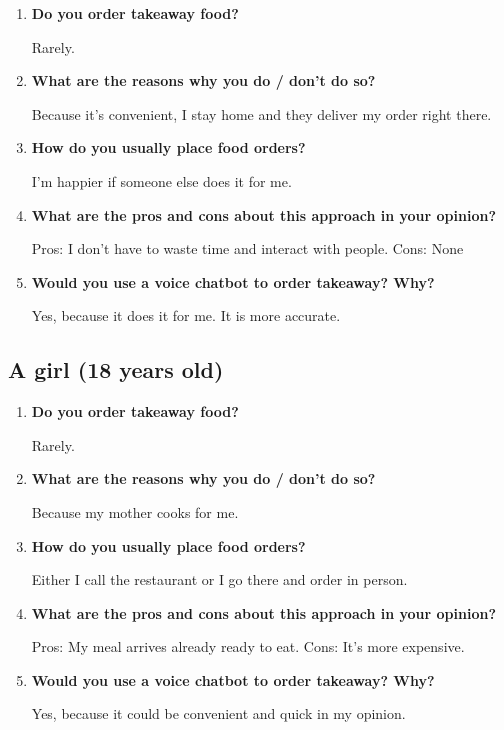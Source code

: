 \begin{enumerate}

\item \textbf{Do you order takeaway food?}

Rarely.

\item \textbf{What are the reasons why you do / don't do so?}

Because it's convenient, I stay home and they deliver my order right there.

\item \textbf{How do you usually place food orders?}

I'm happier if someone else does it for me.

\item \textbf{What are the pros and cons about this approach in your opinion?}

Pros: I don't have to waste time and interact with people.
Cons: None

\item \textbf{Would you use a voice chatbot to order takeaway? Why?}

Yes, because it does it for me. It is more accurate.

\end{enumerate}


\subsection*{A girl (18 years old)}

\begin{enumerate}

\item \textbf{Do you order takeaway food?}

Rarely.

\item \textbf{What are the reasons why you do / don't do so?}

Because my mother cooks for me.

\item \textbf{How do you usually place food orders?}

Either I call the restaurant or I go there and order in person.

\item \textbf{What are the pros and cons about this approach in your opinion?}

Pros: My meal arrives already ready to eat.
Cons: It's more expensive.

\item \textbf{Would you use a voice chatbot to order takeaway? Why?}

Yes, because it could be convenient and quick in my opinion.

\end{enumerate}



